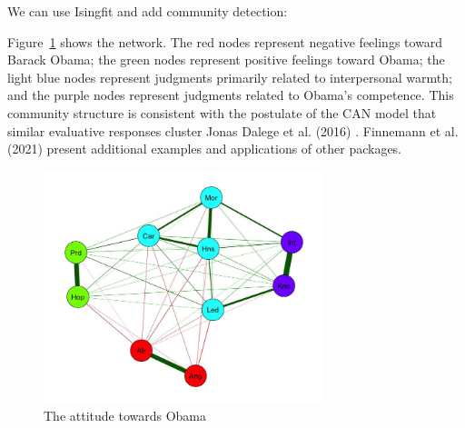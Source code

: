 \documentclass[
  letterpaper,
]{scrbook}
\newenvironment{Shaded}{\begin{snugshade}}{\end{snugshade}}
\newcommand{\AttributeTok}[1]{\textcolor[rgb]{0.40,0.45,0.13}{#1}}
\newcommand{\CommentTok}[1]{\textcolor[rgb]{0.37,0.37,0.37}{#1}}
\newcommand{\ConstantTok}[1]{\textcolor[rgb]{0.56,0.35,0.01}{#1}}
\newcommand{\DecValTok}[1]{\textcolor[rgb]{0.68,0.00,0.00}{#1}}
\newcommand{\FunctionTok}[1]{\textcolor[rgb]{0.28,0.35,0.67}{#1}}
\newcommand{\NormalTok}[1]{\textcolor[rgb]{0.00,0.23,0.31}{#1}}
\newcommand{\OtherTok}[1]{\textcolor[rgb]{0.00,0.23,0.31}{#1}}
\newcommand{\SpecialCharTok}[1]{\textcolor[rgb]{0.37,0.37,0.37}{#1}}
\newcommand{\StringTok}[1]{\textcolor[rgb]{0.13,0.47,0.30}{#1}}
\begin{document}
We can use Isingfit and add community detection:

\begin{Shaded}
\end{Shaded}

Figure~\ref{fig-ch6-img19-old-88} shows the network. The red nodes
represent negative feelings toward Barack Obama; the green nodes
represent positive feelings toward Obama; the light blue nodes represent
judgments primarily related to interpersonal warmth; and the purple
nodes represent judgments related to Obama's competence. This community
structure is consistent with the postulate of the CAN model that similar
evaluative responses cluster Jonas Dalege et al. (2016) . Finnemann et
al. (2021) present additional examples and applications of other
packages.

\begin{figure}

{\centering \includegraphics[width=3.21487in,height=\textheight]{media/ch6/image19.jpg}

}

\caption{\label{fig-ch6-img19-old-88}The attitude towards Obama}

\end{figure}
\end{document}
